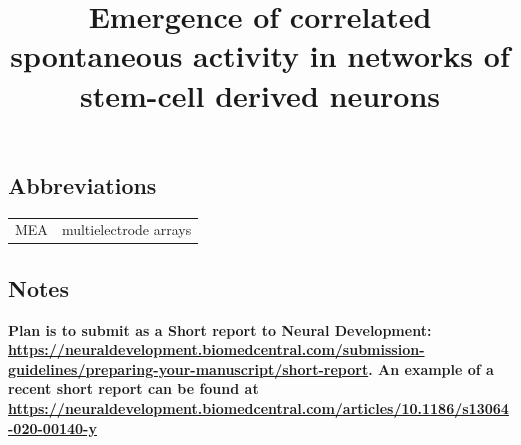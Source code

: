\documentclass{bmcart}
\newcommand{\thetitle}{Emergence of correlated spontaneous activity in
  networks of stem-cell derived neurons}
\begin{document}
\begin{frontmatter}

\begin{fmbox}

\title{\thetitle}

\author[
   addressref={aff1},
   noteref={n1}
]{ }

\author[
   addressref={aff2},
   noteref={n1}
]{ }

\author[
]{ }

\author[
]{ }

\author[
]{ }

\author[
   addressref={aff2},
   noteref={n2},
   email={sje30@cam.ac.uk}
]{ }

\address[id=aff1]{
    ,
    ,
    ,
}

\address[id=aff2]{
    ,
    ,
    ,
}

\begin{artnotes}


\subsection*{Abbreviations}
\begin{tabular}{ll}
MEA & multielectrode arrays\\
\end{tabular}

\subsection*{Notes}
\textbf{Plan is to submit as a Short report to Neural Development:
  \url{https://neuraldevelopment.biomedcentral.com/submission-guidelines/preparing-your-manuscript/short-report}.
  An example of a recent short report can be found at 
\url{https://neuraldevelopment.biomedcentral.com/articles/10.1186/s13064-020-00140-y}}


\end{artnotes}
\end{fmbox}
\end{frontmatter}
\end{document}
